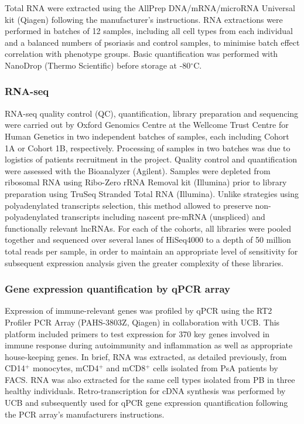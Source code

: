 Total RNA were extracted using the AllPrep DNA/mRNA/microRNA Universal kit (Qiagen) following the manufacturer's instructions. RNA extractions were performed in batches of 12 samples, including all cell types from each individual and a balanced numbers of psoriasis and control samples, to minimise batch effect correlation with phenotype groups. Basic quantification was performed with NanoDrop (Thermo Scientific) before storage at -80{$^\circ$}C.


\subsubsection{RNA-seq}
RNA-seq quality control (QC), quantification, library preparation and sequencing were carried out by Oxford Genomics Centre at the Wellcome Trust Centre for Human Genetics in two independent batches of samples, each including Cohort 1A or Cohort 1B, respectively. Processing of samples in two batches was due to logistics of patients recruitment in the project. Quality control and quantification were assessed with the Bioanalyzer (Agilent). Samples were depleted from ribosomal RNA using Ribo-Zero rRNA Removal kit (Illumina) prior to library preparation using TruSeq Stranded Total RNA (Illumina). Unlike strategies using polyadenylated transcripts selection, this method allowed to preserve non-polyadenylated transcripts including nascent pre-mRNA (unspliced) and functionally relevant lncRNAs. For each of the cohorts, all libraries were pooled together and  sequenced over several lanes of HiSeq4000 to a depth of 50 million total reads per sample, in order to maintain an appropriate level of sensitivity for subsequent expression analysis given the greater complexity of these libraries.

\subsubsection{Gene expression quantification by qPCR array}
Expression of immune-relevant genes was profiled by qPCR using the RT2 Profiler PCR Array (PAHS-3803Z, Qiagen) in collaboration with UCB. This platform included primers to test expression for 370 key genes involved in immune response during autoimmunity and inflammation as well as appropriate house-keeping genes. In brief, RNA was extracted, as detailed previously, from CD14$^+$ monocytes, mCD4$^+$ and mCD8$^+$ cells isolated from PsA patients by FACS. RNA was also extracted for the same cell types isolated from PB in three healthy individuals. Retro-transcription for cDNA synthesis was performed by UCB and subsequently used for qPCR gene expression quantification following the PCR array's manufacturers instructions.  

